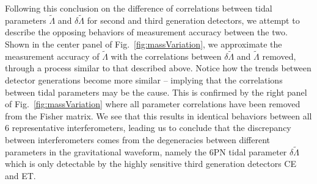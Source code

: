 \documentclass[prd,twocolumn,nofootinbib,superscriptaddress,amsmath,amssymb]{revtex4-1}
\begin{document}
Following this conclusion on the difference of correlations between tidal parameters $\tilde\Lambda$ and $\delta\tilde\Lambda$ for second and third generation detectors, we attempt to describe the opposing behaviors of measurement accuracy between the two.
Shown in the center panel of Fig.~\ref{fig:massVariation}, we approximate the measurement accuracy of $\tilde\Lambda$ with the correlations between $\delta\tilde\Lambda$ and $\tilde\Lambda$ removed, through a process similar to that described above. 
Notice how the trends between detector generations become more similar -- implying that the correlations between tidal parameters may be the cause.
This is confirmed by the right panel of Fig.~\ref{fig:massVariation} where all parameter correlations have been removed from the Fisher matrix.
We see that this results in identical behaviors between all 6 representative interferometers, leading us to conclude that the discrepancy between interferometers comes from the degeneracies between different parameters in the gravitational waveform, namely the 6PN tidal parameter $\delta\tilde\Lambda$ which is only detectable by the highly sensitive third generation detectors CE and ET.

\clearpage

\end{document}
